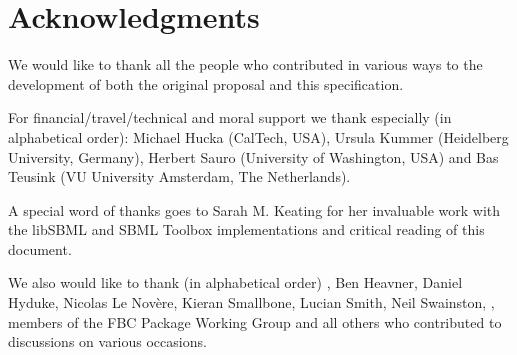
\section{Acknowledgments}

We would like to thank all the people who contributed in various ways to the development of both the original proposal and this specification.

For financial/travel/technical and moral support we thank especially (in alphabetical order): Michael Hucka (CalTech, USA), Ursula Kummer (Heidelberg University, Germany), Herbert Sauro (University of Washington, USA) and Bas Teusink (VU University Amsterdam, The Netherlands).

A special word of thanks goes to Sarah M. Keating for her invaluable work with the \textsf{libSBML} and \textsf{SBML Toolbox} implementations and critical reading of this document.

We also would like to thank (in alphabetical order) , Ben Heavner, Daniel Hyduke, Nicolas Le Nov\`{e}re, Kieran Smallbone, Lucian Smith, Neil Swainston, , members of the \textsf{FBC Package Working Group} and all others who contributed to discussions on various occasions.


